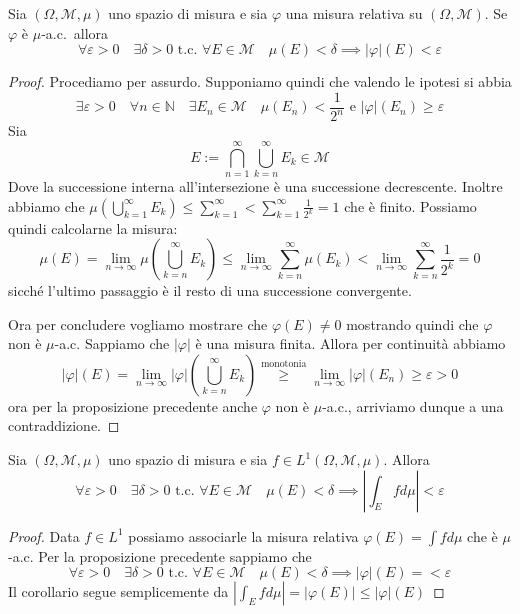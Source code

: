 \begin{proposition}
    Sia \((\Omega, \mathcal{M}, \mu)\) uno spazio di misura e sia \(\varphi \)
    una misura relativa su \((\Omega, \mathcal{M})\). Se \(\varphi \) è
    \(\mu\)-a.c.~allora 
    \[
        \forall \varepsilon>0 \quad \exists \delta >0 \text{ t.c. } \forall E
        \in \mathcal{M} \quad \mu(E) <\delta \implies |\varphi |(E) < \varepsilon
    \]
\end{proposition}
\begin{proof}
    Procediamo per assurdo. Supponiamo quindi che valendo le ipotesi si abbia
    \[
        \exists \varepsilon >0 \quad \forall n \in \mathbb{N} \quad \exists E_{n} \in
        \mathcal{M} \quad \mu(E_n) < \frac{1}{2^{n}} \text{ e } |\varphi|(E_n) \ge
        \varepsilon
    \]
    Sia 
    \[
        E := \bigcap_{n=1}^{\infty} \bigcup_{k=n}^{\infty} E_k \in \mathcal{M} 
    \]
    Dove la successione interna all'intersezione è una successione decrescente.
    Inoltre abbiamo che \(\mu{\left( \bigcup_{k=1}^{\infty}E_k  \right)}\le
    \sum_{k=1}^{\infty} < \sum_{k=1}^{\infty} \frac{1}{2^{k}} = 1\) che è
    finito.
    Possiamo quindi calcolarne la misura:
    \[
        \mu(E) = \lim_{n \to \infty} \mu\left( \bigcup_{k=n}^{\infty} E_k
        \right) \le \lim_{n \to \infty} \sum_{k=n}^{\infty} \mu(E_k) < \lim_{n
        \to \infty} \sum_{k=n}^{\infty} \frac{1}{2^{k}} = 0 
    \]
    sicché l'ultimo passaggio è il resto di una successione convergente.

    Ora per concludere vogliamo mostrare che \(\varphi (E) \neq 0\) mostrando
    quindi che \(\varphi \) non è \(\mu\)-a.c. Sappiamo che \(|\varphi |\) è una
    misura finita. Allora per continuità abbiamo
    \[
        |\varphi |(E) = \lim_{n \to \infty} |\varphi |{\left(
        \bigcup_{k=n}^{\infty}E_k  \right)} \overset{\text{monotonia}}{\ge}
        \lim_{n \to \infty} |\varphi |(E_n) \ge \varepsilon >0
    \]
    ora per la proposizione precedente anche \(\varphi \) non è \(\mu\)-a.c.,
    arriviamo dunque a una contraddizione.
\end{proof}
\begin{corollary}
    Sia \((\Omega, \mathcal{M}, \mu)\) uno spazio di misura e sia \(f \in
    L^{1}(\Omega, \mathcal{M}, \mu)\). Allora 
    \[
        \forall \varepsilon > 0 \quad \exists \delta > 0 \text{ t.c. } \forall E
        \in \mathcal{M} \quad \mu(E) < \delta \implies \left|\int_{E} f
        d\mu\right| < \varepsilon
    \]
\end{corollary}
\begin{proof}
    Data \(f \in L^{1}\) possiamo associarle la misura relativa \(\varphi(E) =
    \int f d\mu\) che è \(\mu\)-a.c. Per la proposizione precedente sappiamo che
    \[
        \forall \varepsilon > 0 \quad \exists \delta > 0 \text{ t.c. } \forall E
        \in \mathcal{M} \quad \mu(E) < \delta \implies |\varphi|(E) = <
        \varepsilon
    \]
    Il corollario segue semplicemente da \( \left| \int_E f d\mu\right| =
    |\varphi(E)| \le |\varphi |(E) \) 
\end{proof}

